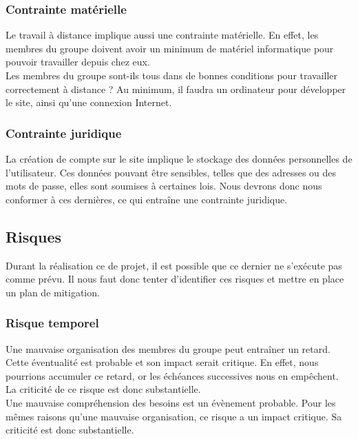 \documentclass[a4paper,11pt]{article}
\begin{document}
\subsubsection{Contrainte matérielle}

Le travail à distance implique aussi une contrainte matérielle. En effet, les membres du groupe doivent
avoir un minimum de matériel informatique pour pouvoir travailler depuis chez eux.\\

Les membres du groupe sont-ils tous dans de bonnes conditions pour travailler correctement à
distance ? Au minimum, il faudra un ordinateur pour développer le site, ainsi qu’une connexion
Internet.\\

\subsubsection{Contrainte juridique}

La création de compte sur le site implique le stockage des données personnelles de l’utilisateur. Ces
données pouvant être sensibles, telles que des adresses ou des mots de passe, elles sont soumises à
certaines lois. Nous devrons donc nous conformer à ces dernières, ce qui entraîne une contrainte
juridique.\\

\subsection{Risques}

Durant la réalisation ce de projet, il est possible que ce dernier ne s’exécute pas comme prévu. Il nous
faut donc tenter d’identifier ces risques et mettre en place un plan de mitigation.\\

\subsubsection{Risque temporel}

Une mauvaise organisation des membres du groupe peut entraîner un retard. Cette éventualité est
probable et son impact serait critique. En effet, nous pourrions accumuler ce retard, or les échéances
successives nous en empêchent. La criticité de ce risque est donc substantielle.\\

Une mauvaise compréhension des besoins est un évènement probable. Pour les mêmes raisons
qu'une mauvaise organisation, ce risque a un impact critique. Sa criticité est donc substantielle.\\
\end{document}
